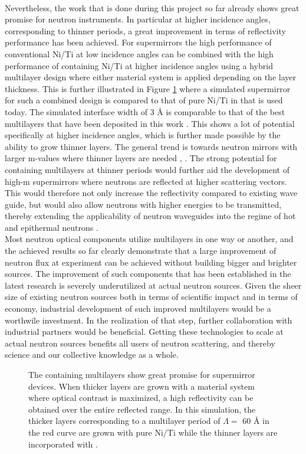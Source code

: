 \\
Nevertheless, the work that is done during this project so far already shows great promise for neutron instruments. In particular at higher incidence angles, corresponding to thinner periods, a great improvement in terms of reflectivity performance has been achieved. For supermirrors the high performance of conventional Ni/Ti at low incidence angles can be combined with the high performance of \BC containing Ni/Ti at higher incidence angles using a hybrid multilayer design where either material system is applied depending on the layer thickness. This is further illustrated in Figure \ref{outlook} where a simulated supermirror for such a combined design is compared to that of pure Ni/Ti in that is used today. The simulated interface width of 3 Å is comparable to that of the best multilayers that have been deposited in this work \cite{GISAXS_paper}. This shows a lot of potential specifically at higher incidence angles, which is further made possible by the ability to grow thinner layers. The general trend is towards neutron mirrors with larger m-values where thinner layers are needed \cite{large_m_value1}, \cite{large_m_value2}. The strong potential for \BC containing multilayers at thinner periods would further aid the development of high-m supermirrors where neutrons are reflected at higher scattering vectors. This would therefore not only increase the reflectivity compared to existing wave guide, but would also allow neutrons with higher energies to be transmitted, thereby extending the applicability of neutron waveguides into the regime of hot and epithermal neutrons \cite{morphology_paper}. \\ Most neutron optical components utilize multilayers in one way or another, and the achieved results so far clearly demonstrate that a large improvement of neutron flux at experiment can be achieved without building bigger and brighter sources. The improvement of such components that has been established in the latest research is severely underutilized at actual neutron sources. Given the sheer size of existing neutron sources both in terms of scientific impact and in terms of economy, industrial development of such improved multilayers would be a worthwile investment. In the realization of that step, further collaboration with industrial partners would be beneficial. Getting these technologies to scale at actual neutron sources benefits all users of neutron scattering, and thereby science and our collective knowledge as a whole. 
\begin{figure}
	\centering
	\def\svgwidth{\textwidth}
	
	\caption{The \BC containing multilayers show great promise for supermirror devices. When thicker layers are grown with a material system where optical contrast is maximized, a high reflectivity can be obtained over the entire reflected range. In this simulation, the thicker layers corresponding to a multilayer period of $\Lambda =$ 60 Å in the red curve are grown with pure Ni/Ti while the thinner layers are incorporated with \BC.}
	\label{outlook}
\end{figure}
\clearpage
